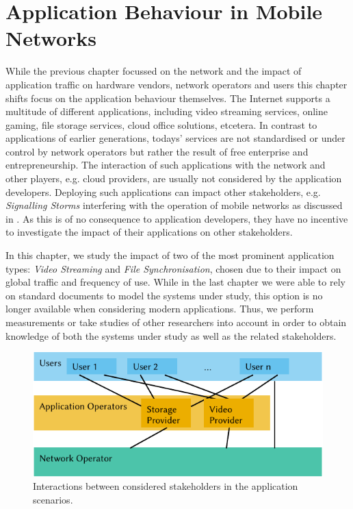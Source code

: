 \chapter{Application Behaviour in Mobile Networks}\label{chap:application}

\newcommand{\download}{Download\xspace}
\newcommand{\live}{Live\xspace}
\newcommand{\serviceprovisioning}{Provisioning\xspace}
\newcommand{\streaming}{Streaming\xspace}

While the previous chapter focussed on the network and the impact of application traffic on hardware vendors, network operators and users this chapter shifts focus on the application behaviour themselves.
The Internet supports a multitude of different applications, including video streaming services, online gaming, file storage services, cloud office solutions, etcetera.
In contrast to applications of earlier generations, todays' services are not standardised or under control by network operators but rather the result of free enterprise and entrepreneurship.
The interaction of such applications with the network and other players, e.g. cloud providers, are usually not considered by the application developers.
Deploying such applications can impact other stakeholders, e.g. \emph{Signalling Storms} interfering with the operation of mobile networks as discussed in .
As this is of no consequence to application developers, they have no incentive to investigate the impact of their applications on other stakeholders.

In this chapter, we study the impact of two of the most prominent application types: \emph{Video Streaming} and \emph{File Synchronisation}, chosen due to their impact on global traffic and frequency of use.
While in the last chapter we were able to rely on standard documents to model the systems under study, this option is no longer available when considering modern applications.
Thus, we perform measurements or take studies of other researchers into account in order to obtain knowledge of both the systems under study as well as the related stakeholders.

\begin{figure}
  \centering
  \includegraphics{application/figures/stakeholders}
  \caption{Interactions between considered stakeholders in the application scenarios.}
  \label{fig:application:stakeholders}
\end{figure}

